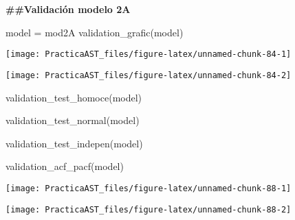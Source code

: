 \documentclass[
]{article}
\newenvironment{Shaded}{\begin{snugshade}}{\end{snugshade}}
\newcommand{\FunctionTok}[1]{\textcolor[rgb]{0.00,0.00,0.00}{#1}}
\newcommand{\NormalTok}[1]{#1}
\newcommand{\OtherTok}[1]{\textcolor[rgb]{0.56,0.35,0.01}{#1}}
\begin{document}
\textbf{\#\#Validación modelo 2A}

\begin{Shaded}
\begin{Highlighting}[]
\NormalTok{model }\OtherTok{=}\NormalTok{ mod2A}
\FunctionTok{validation\_grafic}\NormalTok{(model)}
\end{Highlighting}
\end{Shaded}

\begin{center}\texttt{[image: PracticaAST\_files/figure-latex/unnamed-chunk-84-1]} \end{center}

\begin{center}\texttt{[image: PracticaAST\_files/figure-latex/unnamed-chunk-84-2]} \end{center}

\begin{Shaded}
\begin{Highlighting}[]
\FunctionTok{validation\_test\_homoce}\NormalTok{(model)}
\end{Highlighting}
\end{Shaded}

\begin{Shaded}
\begin{Highlighting}[]
\FunctionTok{validation\_test\_normal}\NormalTok{(model)}
\end{Highlighting}
\end{Shaded}

\begin{Shaded}
\begin{Highlighting}[]
\FunctionTok{validation\_test\_indepen}\NormalTok{(model)}
\end{Highlighting}
\end{Shaded}

\begin{Shaded}
\begin{Highlighting}[]
\FunctionTok{validation\_acf\_pacf}\NormalTok{(model)}
\end{Highlighting}
\end{Shaded}

\begin{center}\texttt{[image: PracticaAST\_files/figure-latex/unnamed-chunk-88-1]} \end{center}

\begin{center}\texttt{[image: PracticaAST\_files/figure-latex/unnamed-chunk-88-2]} \end{center}
\end{document}
